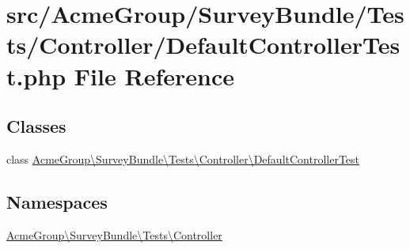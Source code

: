 \hypertarget{_default_controller_test_8php}{\section{src/\+Acme\+Group/\+Survey\+Bundle/\+Tests/\+Controller/\+Default\+Controller\+Test.php File Reference}
\label{_default_controller_test_8php}
}
\subsection*{Classes}
\begin{DoxyCompactItemize}
\item 
class \hyperlink{class_acme_group_1_1_survey_bundle_1_1_tests_1_1_controller_1_1_default_controller_test}{Acme\+Group\textbackslash{}\+Survey\+Bundle\textbackslash{}\+Tests\textbackslash{}\+Controller\textbackslash{}\+Default\+Controller\+Test}
\end{DoxyCompactItemize}
\subsection*{Namespaces}
\begin{DoxyCompactItemize}
\item 
 \hyperlink{namespace_acme_group_1_1_survey_bundle_1_1_tests_1_1_controller}{Acme\+Group\textbackslash{}\+Survey\+Bundle\textbackslash{}\+Tests\textbackslash{}\+Controller}
\end{DoxyCompactItemize}
